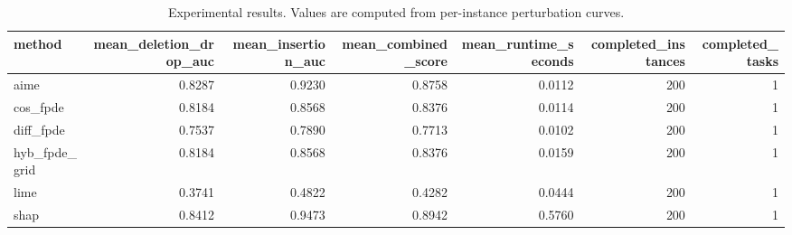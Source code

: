 \begin{table}[t]
\caption{Experimental results. Values are computed from per-instance perturbation curves.}
\label{tab:main_results_computed}
\centering
\begin{tabular}{lrrrrrr}
\toprule
method & mean\_deletion\_drop\_auc & mean\_insertion\_auc & mean\_combined\_score & mean\_runtime\_seconds & completed\_instances & completed\_tasks \\
\midrule
aime & 0.8287 & 0.9230 & 0.8758 & 0.0112 & 200 & 1 \\
cos\_fpde & 0.8184 & 0.8568 & 0.8376 & 0.0114 & 200 & 1 \\
diff\_fpde & 0.7537 & 0.7890 & 0.7713 & 0.0102 & 200 & 1 \\
hyb\_fpde\_grid & 0.8184 & 0.8568 & 0.8376 & 0.0159 & 200 & 1 \\
lime & 0.3741 & 0.4822 & 0.4282 & 0.0444 & 200 & 1 \\
shap & 0.8412 & 0.9473 & 0.8942 & 0.5760 & 200 & 1 \\
\bottomrule
\end{tabular}

\end{table}

